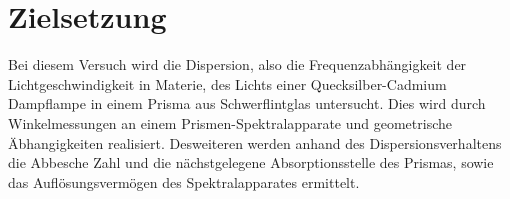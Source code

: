 \section{Zielsetzung}
\label{sec:Zielsetzung}
Bei diesem Versuch wird die Dispersion, also die Frequenzabhängigkeit der Lichtgeschwindigkeit in Materie, des Lichts einer
Quecksilber-Cadmium Dampflampe in einem Prisma aus Schwerflintglas untersucht. Dies wird durch Winkelmessungen
an einem Prismen-Spektralapparate und geometrische Äbhangigkeiten realisiert.
Desweiteren werden anhand des Dispersionsverhaltens die Abbesche Zahl und die nächstgelegene Absorptionsstelle des Prismas, sowie das Auflösungsvermögen des
Spektralapparates ermittelt.
